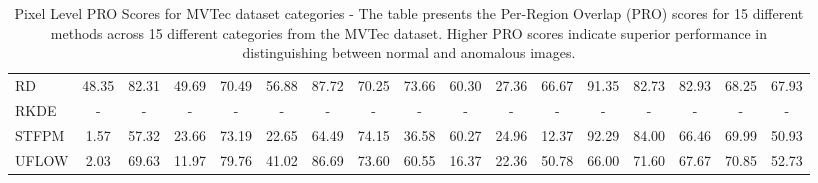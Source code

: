 \begin{table}[h!]
{\begin{tabular}{l*{16}{c}}
        RD & 48.35 & 82.31 & 49.69 & 70.49 & 56.88 & 87.72 & 70.25 & 73.66 & 60.30 & 27.36 & 66.67 & 91.35 & 82.73 & 82.93 & 68.25 & 67.93 \\
        RKDE & - & - & - & - & - & - & - & - & - & - & - & - & - & - & - & - \\
        STFPM & 1.57 & 57.32 & 23.66 & 73.19 & 22.65 & 64.49 & 74.15 & 36.58 & 60.27 & 24.96 & 12.37 & 92.29 & 84.00 & 66.46 & 69.99 & 50.93 \\
        UFLOW & 2.03 & 69.63 & 11.97 & 79.76 & 41.02 & 86.69 & 73.60 & 60.55 & 16.37 & 22.36 & 50.78 & 66.00 & 71.60 & 67.67 & 70.85 & 52.73 \\
        \bottomrule
    \end{tabular}
    }
    \caption{Pixel Level PRO Scores for MVTec\cite{Bergmann_2019_CVPR} dataset categories - The table presents the Per-Region Overlap (PRO) scores for 15 different methods across 15 different categories from the MVTec dataset. Higher PRO scores indicate superior performance in distinguishing between normal and anomalous images.}
    \label{table:MVTec Pixel PRO}
\end{table}